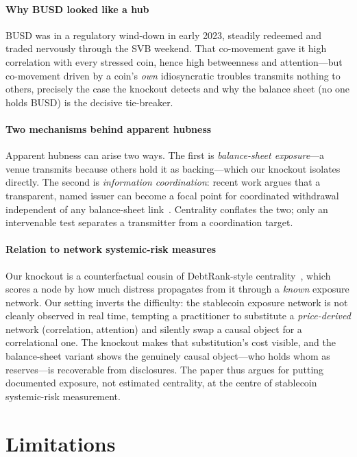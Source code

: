 \documentclass[sigconf,anonymous]{acmart}
\begin{document}
\paragraph{Why BUSD looked like a hub} BUSD was in a regulatory wind-down in early 2023, steadily
redeemed and traded nervously through the SVB weekend. That co-movement gave it high correlation
with every stressed coin, hence high betweenness and attention---but co-movement driven by a coin's
\emph{own} idiosyncratic troubles transmits nothing to others, precisely the case the knockout
detects and why the balance sheet (no one holds BUSD) is the decisive tie-breaker.

\paragraph{Two mechanisms behind apparent hubness} Apparent hubness can arise two ways. The first is
\emph{balance-sheet exposure}---a venue transmits because others hold it as backing---which our
knockout isolates directly. The second is \emph{information coordination}: recent work argues that a
transparent, named issuer can become a focal point for coordinated withdrawal independent of any
balance-sheet link~\cite{iaqf_ucla_transparency_2026}. Centrality conflates the two; only an
intervenable test separates a transmitter from a coordination target.

\paragraph{Relation to network systemic-risk measures} Our knockout is a counterfactual cousin of
DebtRank-style centrality~\cite{battiston2012debtrank}, which scores a node by how much distress
propagates from it through a \emph{known} exposure network. Our setting inverts the difficulty: the
stablecoin exposure network is not cleanly observed in real time, tempting a practitioner to
substitute a \emph{price-derived} network (correlation, attention) and silently swap a causal
object for a correlational one. The knockout makes that substitution's cost visible, and the
balance-sheet variant shows the genuinely causal object---who holds whom as reserves---is
recoverable from disclosures. The paper thus argues for putting documented exposure, not estimated
centrality, at the centre of stablecoin systemic-risk measurement.

\section{Limitations}
\end{document}
